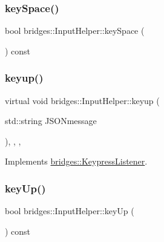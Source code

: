 \subsubsection{\texorpdfstring{key\+Space()}{keySpace()}}
{\footnotesize\ttfamily bool bridges\+::\+Input\+Helper\+::key\+Space (\begin{DoxyParamCaption}{ }\end{DoxyParamCaption}) const\hspace{0.3cm}{\ttfamily [inline]}}

\mbox{\label{classbridges_1_1_input_helper_a55757d526340d939052cf1dca755262b}} 
\subsubsection{\texorpdfstring{keyup()}{keyup()}}
{\footnotesize\ttfamily virtual void bridges\+::\+Input\+Helper\+::keyup (\begin{DoxyParamCaption}\item[{std\+::string}]{J\+S\+O\+Nmessage }\end{DoxyParamCaption})\hspace{0.3cm}{\ttfamily [inline]}, {\ttfamily [override]}, {\ttfamily [protected]}, {\ttfamily [virtual]}}



Implements \hyperlink{classbridges_1_1_keypress_listener_ad5af91d35dc485182056ca821f3ce03e}{bridges\+::\+Keypress\+Listener}.

\mbox{\label{classbridges_1_1_input_helper_a4af008528d2dcb4b985050c2945875fc}} 
\subsubsection{\texorpdfstring{key\+Up()}{keyUp()}}
{\footnotesize\ttfamily bool bridges\+::\+Input\+Helper\+::key\+Up (\begin{DoxyParamCaption}{ }\end{DoxyParamCaption}) const\hspace{0.3cm}{\ttfamily [inline]}}

